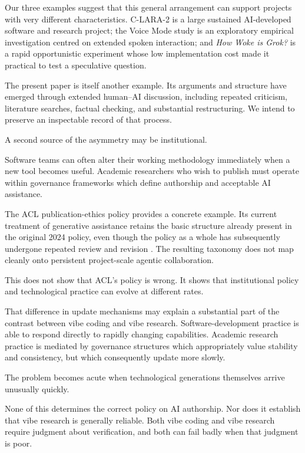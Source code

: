 Our three examples suggest that this general arrangement can support projects with very different characteristics. C-LARA-2 is a large sustained AI-developed software and research project; the Voice Mode study is an exploratory empirical investigation centred on extended spoken interaction; and \emph{How Woke is Grok?} is a rapid opportunistic experiment whose low implementation cost made it practical to test a speculative question.

The present paper is itself another example. Its arguments and structure have emerged through extended human--AI discussion, including repeated criticism, literature searches, factual checking, and substantial restructuring. We intend to preserve an inspectable record of that process.

A second source of the asymmetry may be institutional.

Software teams can often alter their working methodology immediately when a new tool becomes useful. Academic researchers who wish to publish must operate within governance frameworks which define authorship and acceptable AI assistance.

The ACL publication-ethics policy provides a concrete example. Its current treatment of generative assistance retains the basic structure already present in the original 2024 policy, even though the policy as a whole has subsequently undergone repeated review and revision \citep{acl2024policy,acl2026policy,aclresolutions2025}. The resulting taxonomy does not map cleanly onto persistent project-scale agentic collaboration.

This does not show that ACL's policy is wrong. It shows that institutional policy and technological practice can evolve at different rates.

That difference in update mechanisms may explain a substantial part of the contrast between vibe coding and vibe research. Software-development practice is able to respond directly to rapidly changing capabilities. Academic research practice is mediated by governance structures which appropriately value stability and consistency, but which consequently update more slowly.

The problem becomes acute when technological generations themselves arrive unusually quickly.

None of this determines the correct policy on AI authorship. Nor does it establish that vibe research is generally reliable. Both vibe coding and vibe research require judgment about verification, and both can fail badly when that judgment is poor.

